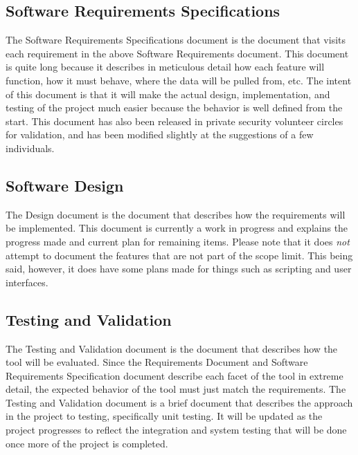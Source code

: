 \documentclass[letterpaper,12pt]{article}
\begin{document}
\subsection{Software Requirements Specifications}
\label{software_specifications}
The Software Requirements Specifications document \cite{Specification} is the
document that visits each requirement in the above Software Requirements
document.  This document is quite long because it describes in meticulous detail
how each feature will function, how it must behave, where the data will be
pulled from, etc.  The intent of this document is that it will make the actual
design, implementation, and testing of the project much easier because the
behavior is well defined from the start.  This document has also been released
in private security volunteer circles for validation, and has been modified
slightly at the suggestions of a few individuals.

\subsection{Software Design}
\label{software_design}
The Design document \cite{Design} is the document that describes how the
requirements will be implemented.  This document is currently a work in progress
and explains the progress made and current plan for remaining items.  Please
note that it does \textit{not} attempt to document the features that are not
part of the scope limit.  This being said, however, it does have some plans made
for things such as scripting and user interfaces.  

\subsection{Testing and Validation}
\label{testing_and_evaluation}
The Testing and Validation document \cite{Testing} is the document that
describes how the tool will be evaluated.  Since the Requirements
Document \cite{Requirements} and Software Requirements Specification
\cite{Specification} document describe each facet of the tool in extreme
detail, the expected behavior of the tool must just match the requirements.  The
Testing and Validation document is a brief document that describes the approach
in the project to testing, specifically unit testing.  It will be updated as the
project progresses to reflect the integration and system testing that will be
done once more of the project is completed.

\newpage
\end{document}
